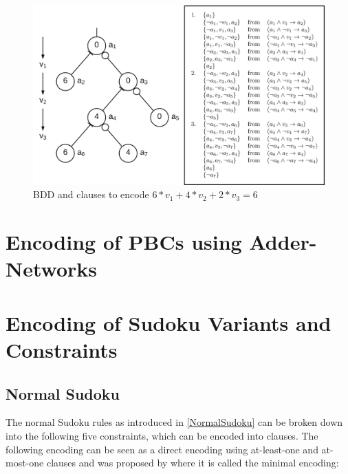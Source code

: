 \begin{figure}
\centering
\includegraphics[width=\textwidth]{Figures/BDDExampleComposition.png}
\caption{BDD and clauses to encode $6*v_1+4*v_2+2*v_3=6$}
\label{fig:BDDExample}
\end{figure}


\section{Encoding of PBCs using Adder-Networks}\label{PBCEncodingAdderNetworks}

\section{Encoding of Sudoku Variants and Constraints}

\subsection{Normal Sudoku}
The normal Sudoku rules as introduced in \ref{NormalSudoku} can be broken down into the following five constraints, which can be encoded into clauses. The following encoding can be seen as a direct encoding using at-least-one and at-most-one clauses and was proposed by \cite{Lynce2006SudokuAsASATProblem} where it is called the minimal encoding:\\


